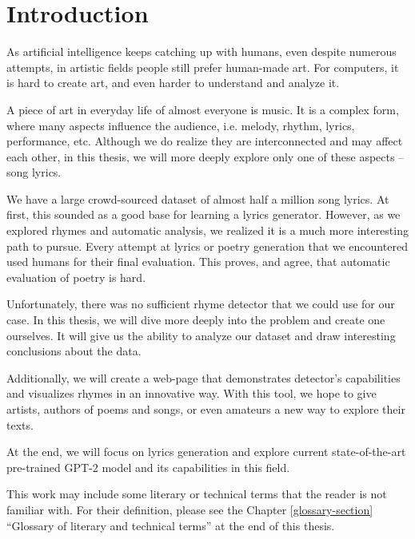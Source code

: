 \chapter*{Introduction}

As artificial intelligence keeps catching up with humans, even despite numerous attempts, in artistic fields people still prefer human-made art.
For computers, it is hard to create art, and even harder to understand and analyze it. 

A piece of art in everyday life of almost everyone is music. It is a complex form, where many aspects influence the audience, i.e. melody, rhythm, lyrics, performance, etc. Although we do realize they are interconnected and may affect each other, in this thesis, we will more deeply explore only one of these aspects -- song lyrics. 

We have a large crowd-sourced dataset of almost half a million song lyrics. At first, this sounded as a good base for learning a lyrics generator. However, as we explored rhymes and automatic analysis, we realized it is a much more interesting path to pursue. Every attempt at lyrics or poetry generation that we encountered used humans for their final evaluation. This proves, and \cite{greene2010automatic} agree, that automatic evaluation of poetry is hard.

Unfortunately, there was no sufficient rhyme detector that we could use for our case. In this thesis, we will dive more deeply into the problem and create one ourselves. It will give us the ability to analyze our dataset and draw interesting conclusions about the data. 

Additionally, we will create a web-page that demonstrates detector's capabilities and visualizes rhymes in an innovative way. With this tool, we hope to give artists, authors of poems and songs, or even amateurs a new way to explore their texts.

At the end, we will focus on lyrics generation and explore current state-of-the-art
pre-trained GPT-2 model and its capabilities in this field.

This work may include some literary or technical terms that the reader is not familiar with. For their definition, please see the Chapter \ref{glossary-section} ``Glossary of literary and technical terms'' at the end of this thesis.


